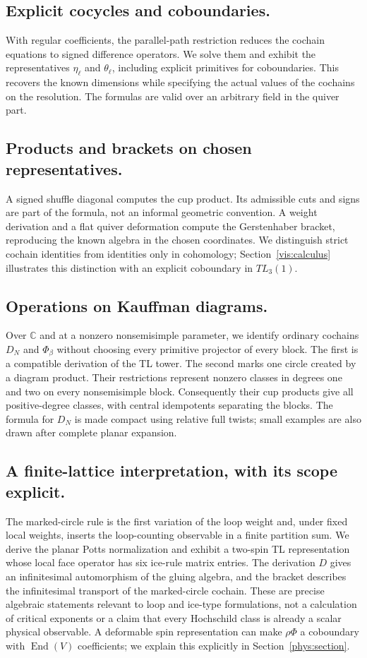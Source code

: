 \documentclass[a4paper,11pt,oneside,reqno]{amsart}
\theoremstyle{definition}
\numberwithin{equation}{section}
\begin{document}
\subsection{Explicit cocycles and coboundaries.}
With regular coefficients, the parallel-path restriction reduces the
cochain equations to signed difference operators. We solve them and
exhibit the representatives $\eta_\ell$ and $\theta_\ell$, including
explicit primitives for coboundaries. This recovers the known dimensions
while specifying the actual values of the cochains on the resolution.
The formulas are valid over an arbitrary field in the quiver part.

\subsection{Products and brackets on chosen representatives.}
A signed shuffle diagonal computes the cup product. Its admissible cuts
and signs are part of the formula, not an informal geometric convention.
A weight derivation and a flat quiver deformation compute the
Gerstenhaber bracket, reproducing the known algebra in the chosen
coordinates. We distinguish strict cochain identities from identities
only in cohomology; Section~\ref{vis:calculus} illustrates this distinction
with an explicit coboundary in $TL_3(1)$.

\subsection{ Operations on Kauffman diagrams.}
Over $\mathbb C$ and at a nonzero nonsemisimple parameter, we identify
ordinary cochains $D_N$ and $\Phi_\beta$ without choosing every primitive
projector of every block. The first is a compatible derivation of the TL
tower. The second marks one circle created by a diagram product.
Their restrictions represent nonzero classes in degrees one and two on
every nonsemisimple block. Consequently their cup products give all
positive-degree classes, with central idempotents separating the blocks.
The formula for $D_N$ is made compact using relative full twists;
small examples are also drawn after complete planar expansion.

\subsection{A finite-lattice interpretation, with its scope explicit.}
The marked-circle rule is the first variation of the loop weight and,
under fixed local weights, inserts the loop-counting observable in a
finite partition sum. We derive the planar Potts normalization and
exhibit a two-spin TL representation whose local face operator has six
ice-rule matrix entries. The derivation $D$ gives an infinitesimal
automorphism of the gluing algebra, and the bracket describes the
infinitesimal transport of the marked-circle cochain. These are precise
algebraic statements relevant to loop and ice-type formulations, not a
calculation of critical exponents or a claim that every Hochschild class
is already a scalar physical observable. A deformable spin representation
can make $\rho\Phi$ a coboundary with $\operatorname{End}(V)$ coefficients;
we explain this explicitly in Section~\ref{phys:section}.
\end{document}
